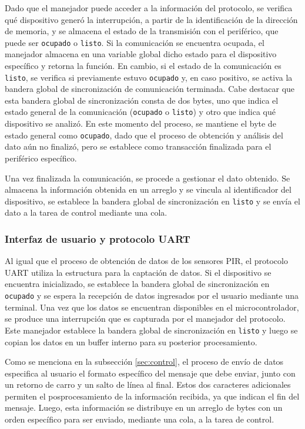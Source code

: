 Dado que el manejador puede acceder a la información del protocolo, se verifica qué dispositivo generó la interrupción, a partir de la identificación de la dirección de memoria, y se almacena el estado de la transmisión con el periférico, que puede ser \texttt{ocupado} o \texttt{listo}. Si la comunicación se encuentra ocupada, el manejador almacena en una variable global dicho estado para el dispositivo específico y retorna la función. En cambio, si el estado de la comunicación es \texttt{listo}, se verifica si previamente estuvo \texttt{ocupado} y, en caso positivo, se activa la bandera global de sincronización de comunicación terminada. Cabe destacar que esta bandera global de sincronización consta de dos bytes, uno que indica el estado general de la comunicación (\texttt{ocupado} o \texttt{listo}) y otro que indica qué dispositivo se analizó. En este momento del proceso, se mantiene el byte de estado general como \texttt{ocupado}, dado que el proceso de obtención y análisis del dato aún no finalizó, pero se establece como transacción finalizada para el periférico específico. 

Una vez finalizada la comunicación, se procede a gestionar el dato obtenido. Se almacena la información obtenida en un arreglo y se vincula al identificador del dispositivo, se establece la bandera global de sincronización en \texttt{listo} y se envía el dato a la tarea de control mediante una cola.

\subsubsection{Interfaz de usuario y protocolo UART}
Al igual que el proceso de obtención de datos de los sensores PIR, el protocolo UART utiliza la estructura para la captación de datos. Si el dispositivo se encuentra inicializado, se establece la bandera global de sincronización en \texttt{ocupado} y se espera la recepción de datos ingresados por el usuario mediante una terminal. Una vez que los datos se encuentran disponibles en el microcontrolador, se produce una interrupción que es capturada por el manejador del protocolo. Este manejador establece la bandera global de sincronización en \texttt{listo} y luego se copian los datos en un buffer interno para su posterior procesamiento.

Como se menciona en la subsección \ref{sec:control}, el proceso de envío de datos especifica al usuario el formato específico del mensaje que debe enviar, junto con un retorno de carro y un salto de línea al final. Estos dos caracteres adicionales permiten el posprocesamiento de la información recibida, ya que indican el fin del mensaje. Luego, esta información se distribuye en un arreglo de bytes con un orden específico para ser enviado, mediante una cola, a la tarea de control. 

